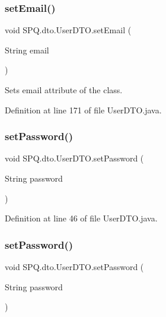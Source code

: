 \subsubsection{\texorpdfstring{set\+Email()}{setEmail()}\hspace{0.1cm}{\footnotesize\ttfamily [3/3]}}
{\footnotesize\ttfamily void S\+P\+Q.\+dto.\+User\+D\+T\+O.\+set\+Email (\begin{DoxyParamCaption}\item[{String}]{email }\end{DoxyParamCaption})}

Sets email attribute of the class. 

Definition at line 171 of file User\+D\+T\+O.\+java.

\mbox{\label{class_s_p_q_1_1dto_1_1_user_d_t_o_a35bd2d50e194e3d923e8adcf229e5a3e}} 
\subsubsection{\texorpdfstring{set\+Password()}{setPassword()}\hspace{0.1cm}{\footnotesize\ttfamily [1/3]}}
{\footnotesize\ttfamily void S\+P\+Q.\+dto.\+User\+D\+T\+O.\+set\+Password (\begin{DoxyParamCaption}\item[{String}]{password }\end{DoxyParamCaption})}



Definition at line 46 of file User\+D\+T\+O.\+java.

\mbox{\label{class_s_p_q_1_1dto_1_1_user_d_t_o_a35bd2d50e194e3d923e8adcf229e5a3e}} 
\subsubsection{\texorpdfstring{set\+Password()}{setPassword()}\hspace{0.1cm}{\footnotesize\ttfamily [2/3]}}
{\footnotesize\ttfamily void S\+P\+Q.\+dto.\+User\+D\+T\+O.\+set\+Password (\begin{DoxyParamCaption}\item[{String}]{password }\end{DoxyParamCaption})}



